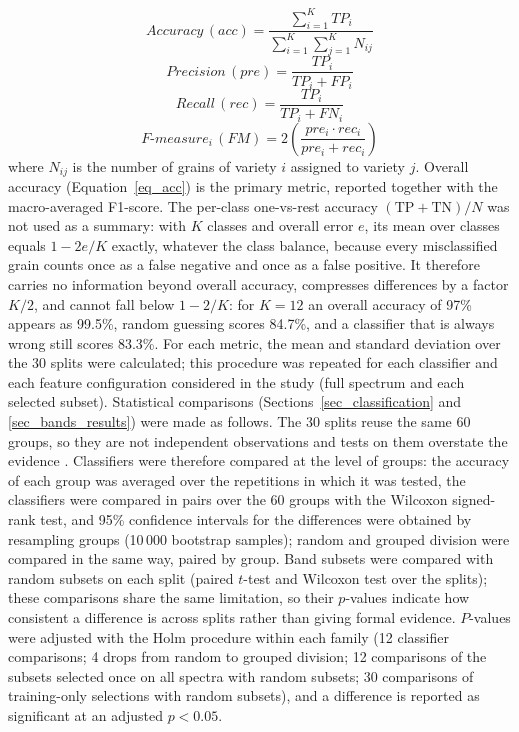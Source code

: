 \documentclass[final,5p,times,twocolumn]{elsarticle}
\newcommand{\added}[1]{#1}
\begin{document}
\begin{itemize}
    \begin{equation}
        Accuracy \, (acc) = \frac{\sum_{i=1}^{K}TP_{i}}{\sum_{i=1}^{K} \sum_{j=1}^{K}N_{ij}}
        \label{eq_acc}
    \end{equation}
    \begin{equation}
        Precision \, (pre) = \frac{TP_{i}}{TP_{i} + FP_{i}}
        \label{eq_pre}
    \end{equation}
    \begin{equation}
        Recall \, (rec) =  \frac{TP_{i}}{TP_{i} + FN_{i}}
        \label{eq_rec}
    \end{equation}
    \begin{equation}
        F\text{-}measure_{i} \, (FM) =  2\left(\frac{pre_{i}\cdot rec_{i}}{pre_{i}+rec_{i}}\right)
        \label{eq_fm}
    \end{equation}
    where $N_{ij}$ is the number of grains of variety $i$ assigned to variety $j$.
\added{Overall accuracy (Equation~\ref{eq_acc}) is the primary metric, reported together with the macro-averaged F1-score. The per-class one-vs-rest accuracy $(\mathrm{TP}+\mathrm{TN})/N$ was not used as a summary: with $K$ classes and overall error $e$, its mean over classes equals $1-2e/K$ exactly, whatever the class balance, because every misclassified grain counts once as a false negative and once as a false positive. It therefore carries no information beyond overall accuracy, compresses differences by a factor $K/2$, and cannot fall below $1-2/K$: for $K=12$ an overall accuracy of 97\% appears as 99.5\%, random guessing scores 84.7\%, and a classifier that is always wrong still scores 83.3\%.}
    For each metric, the mean and standard deviation over the \added{30 splits} were calculated; this procedure was repeated for each classifier and each feature configuration considered in the study (full spectrum and each selected subset).
    \added{Statistical comparisons (Sections~\ref{sec_classification} and \ref{sec_bands_results}) were made as follows. The 30 splits reuse the same 60 groups, so they are not independent observations and tests on them overstate the evidence \citep{Nadeau2003}. Classifiers were therefore compared at the level of groups: the accuracy of each group was averaged over the repetitions in which it was tested, the classifiers were compared in pairs over the 60 groups with the Wilcoxon signed-rank test, and 95\% confidence intervals for the differences were obtained by resampling groups (10\,000 bootstrap samples); random and grouped division were compared in the same way, paired by group. Band subsets were compared with random subsets on each split (paired $t$-test and Wilcoxon test over the splits); these comparisons share the same limitation, so their $p$-values indicate how consistent a difference is across splits rather than giving formal evidence. $P$-values were adjusted with the Holm procedure within each family (12 classifier comparisons; 4 drops from random to grouped division; 12 comparisons of the subsets selected once on all spectra with random subsets; 30 comparisons of training-only selections with random subsets), and a difference is reported as significant at an adjusted $p<0.05$.}

\end{itemize}
\end{document}
